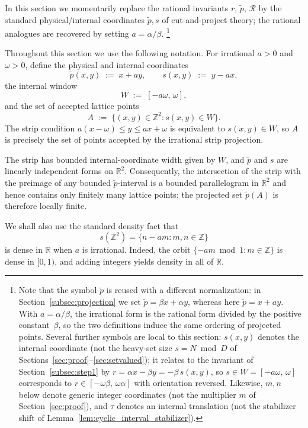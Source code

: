 \documentclass[11pt,reqno]{amsart}
\theoremstyle{plain}
\theoremstyle{definition}
\theoremstyle{remark}
\begin{document}
In this section we momentarily replace the rational invariants \(r\),
\(\tilde p\), \(\mathcal{R}\) by the standard physical/internal coordinates
\(\tilde p, s\) of cut-and-project theory; the rational analogues are
recovered by setting \(a = \alpha/\beta\).%
\footnote{Note that the symbol \(\tilde p\) is reused with a different
normalization: in Section~\ref{subsec:projection} we set
\(\tilde p = \beta x + \alpha y\), whereas here \(\tilde p = x + a y\).
With \(a=\alpha/\beta\), the irrational form is the rational form divided
by the positive constant~\(\beta\), so the two definitions induce the same
ordering of projected points.  Several further symbols are local to this
section: \(s(x,y)\) denotes the internal coordinate (not the heavy-set
size \(s = N \bmod D\) of Sections~\ref{sec:proof}--\ref{sec:setvalued});
it relates to the invariant of Section~\ref{subsec:step1} by
\(r = \alpha x - \beta y = -\beta\, s(x,y)\), so \(s \in W = [-a\omega,\,
\omega]\) corresponds to \(r \in [-\omega\beta,\, \omega\alpha]\) with
orientation reversed.  Likewise, \(m, n\) below denote generic integer
coordinates (not the multiplier \(m\) of Section~\ref{sec:proof}), and
\(\tau\) denotes an internal translation (not the stabilizer shift of
Lemma~\ref{lem:cyclic_interval_stabilizer}).}

Throughout this section we use the following notation.  For irrational
\(a > 0\) and \(\omega > 0\), define the physical and internal coordinates
\[
    \tilde p(x, y) \;:=\; x + a y,
    \qquad
    s(x, y) \;:=\; y - a x,
\]
the internal window
\[
    W \;:=\; [-a\omega,\, \omega],
\]
and the set of accepted lattice points
\[
    A \;:=\; \bigl\{(x, y) \in \mathbb{Z}^2 : s(x, y) \in W\bigr\}.
\]
The strip condition \(a(x-\omega)\le y \le ax+\omega\) is equivalent to
\(s(x, y) \in W\), so \(A\) is precisely the set of points accepted by
the irrational strip projection.

The strip has bounded internal-coordinate width given by \(W\), and
\(\tilde p\) and \(s\) are linearly independent forms on \(\mathbb{R}^2\).
Consequently, the intersection of the strip with the preimage of any
bounded \(\tilde p\)-interval is a bounded parallelogram in
\(\mathbb{R}^2\) and hence contains only finitely many lattice points;
the projected set \(\tilde p(A)\) is therefore locally finite.

We shall also use the standard density fact that
\[
    s(\mathbb{Z}^2)=\{n-a m : m, n\in\mathbb{Z}\}
\]
is dense in \(\mathbb{R}\) when \(a\) is irrational.  Indeed, the orbit
\(\{-a m \bmod 1 : m \in \mathbb{Z}\}\) is dense in \([0,1)\), and adding
integers yields density in all of \(\mathbb{R}\).
\end{document}
